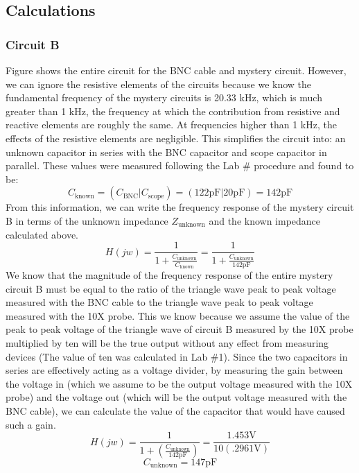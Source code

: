 \documentclass[12pt,letterpaper]{report}
\begin{document}
\subsection*{Calculations}

\subsubsection*{Circuit B}
Figure 
shows the entire circuit for the BNC cable and mystery circuit. However,
we can ignore the resistive elements of the circuits because we know the fundamental frequency of the mystery circuits is 20.33 kHz, which is much greater than 1 kHz, the frequency at which the contribution from resistive and reactive elements are roughly the same. At frequencies higher than 1 kHz, the effects of the resistive elements are negligible. This simplifies the circuit into: an unknown capacitor in series with the BNC capacitor and scope capacitor in parallel. These values were measured following the Lab \# procedure and found to be:
$$
C_{\text{known}} = (C_{ \text{BNC}} | C_{\text{scope}}) = (122 \text{pF} | 20 \text{pF}) = 142 \text{pF}
$$
From this information, we can write the frequency response of the mystery circuit B in terms of the unknown impedance $Z_{\text{unknown}}$ and the known impedance calculated above.
$$
H(jw) = \frac{1}{1+\frac{C_{\text{unknown}}}{C_{\text{known}}}} = \frac{1}{1+\frac{C_{\text{unknown}}}{142 \text{pF}}}
$$
We know that the magnitude of the frequency response of the entire mystery circuit B must be equal to the ratio of the triangle wave peak to peak voltage measured with the BNC cable to the triangle wave peak to peak voltage measured with the 10X probe. This we know because we assume the value of the peak to peak voltage of the triangle wave of circuit B measured by the 10X probe multiplied by ten will be the true output without any effect from measuring devices (The value of ten was calculated in Lab \#1). Since the two capacitors in series are effectively acting as a voltage divider, by measuring the gain between the voltage in (which we assume to be the output voltage measured with the 10X probe) and the voltage out (which will be the output voltage measured with the BNC cable), we can calculate the value of the capacitor that would have caused such a gain.
$$
H(jw) = \frac{1}{1+(\frac{C_{\text{unknown}}}{142 \text{pF}})} = \frac{1.453 \text{V}}{10(.2961\text{V})}
$$
$$
C_{\text{unknown}} = 147 \text{pF}
$$
\end{document}
